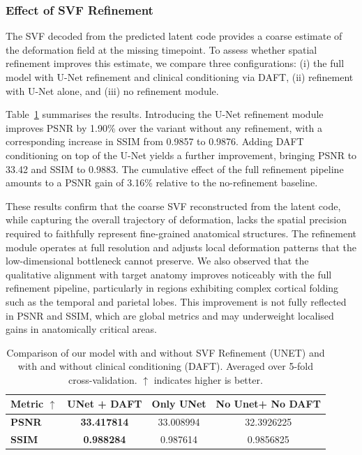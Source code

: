 \subsubsection{Effect of SVF Refinement}

The SVF decoded from the predicted latent code provides a coarse estimate of the deformation field at the missing timepoint. To assess whether spatial refinement improves this estimate, we compare three configurations: (i) the full model with U-Net refinement and clinical conditioning via DAFT, (ii) refinement with U-Net alone, and (iii) no refinement module.

Table~\ref{tab:refinement} summarises the results. Introducing the U-Net refinement module improves PSNR by 1.90\% over the variant without any refinement, with a corresponding increase in SSIM from 0.9857 to 0.9876. Adding DAFT conditioning on top of the U-Net yields a further improvement, bringing PSNR to 33.42 and SSIM to 0.9883. The cumulative effect of the full refinement pipeline amounts to a PSNR gain of 3.16\% relative to the no-refinement baseline.

These results confirm that the coarse SVF reconstructed from the latent code, while capturing the overall trajectory of deformation, lacks the spatial precision required to faithfully represent fine-grained anatomical structures. The refinement module operates at full resolution and adjusts local deformation patterns that the low-dimensional bottleneck cannot preserve. We also observed that the qualitative alignment with target anatomy improves noticeably with the full refinement pipeline, particularly in regions exhibiting complex cortical folding such as the temporal and parietal lobes. This improvement is not fully reflected in PSNR and SSIM, which are global metrics and may underweight localised gains in anatomically critical areas.

\begin{table}[ht]
\centering
\caption{Comparison of our model with and without SVF Refinement (UNET) and with and without clinical conditioning (DAFT). Averaged over 5-fold cross-validation. $\uparrow$ indicates higher is better.}
\begin{tabular}{>{\bfseries}lccc}
\toprule
Metric $\uparrow$ & UNet + DAFT & Only UNet & No Unet+ No DAFT \\
\midrule
PSNR  & \textbf{33.417814} & 33.008994  & 32.3926225 \\
SSIM  & \textbf{0.988284} & 0.987614 & 0.9856825 \\
\bottomrule
\end{tabular}
\label{tab:refinement}
\end{table}

